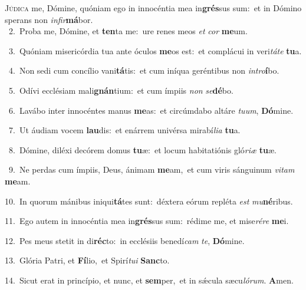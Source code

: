 \lettrine{\initial\textcolor{\initialcolor}{J}}{údica} me, Dómine, quóniam ego in innocéntia mea in\-\textbf{grés}\-sus sum:~\star et in Dómino sperans non \textit{in}\-\textit{fir}\textbf{má}bor.\\
{\numbfont\textcolor{\numbcolor}{~2.}}~Proba me, Dómine, et \textbf{ten}\-ta me:~\star ure renes meos \textit{et} \textit{cor} \textbf{me}\-um.\par
{\numbfont\textcolor{\numbcolor}{~3.}}~Quóniam misericórdia tua ante óculos \textbf{me}\-os est:~\star et complácui in veri\-\textit{tá}\-\textit{te} \textbf{tu}\-a.\par
{\numbfont\textcolor{\numbcolor}{~4.}}~Non sedi cum concílio vani\-\textbf{tá}\-tis:~\star et cum iníqua geréntibus non \textit{in}\-\textit{tro}\textbf{í}bo.\par
{\numbfont\textcolor{\numbcolor}{~5.}}~Odívi ecclésiam mali\-\textbf{gnán}\-tium:~\star et cum ímpiis \textit{non} \textit{se}\-\textbf{dé}bo.\par
{\numbfont\textcolor{\numbcolor}{~6.}}~Lavábo inter innocéntes manus \textbf{me}\-as:~\star et circúmdabo altáre \textit{tu}\-\textit{um}, \textbf{Dó}\-mine.\par
{\numbfont\textcolor{\numbcolor}{~7.}}~Ut áudiam vocem \textbf{lau}\-dis:~\star et enárrem univérsa mirabí\-\textit{li}\-\textit{a} \textbf{tu}\-a.\par
{\numbfont\textcolor{\numbcolor}{~8.}}~Dómine, diléxi decórem domus \textbf{tu}\-æ:~\star et locum habitatiónis gló\-\textit{ri}\-\textit{æ} \textbf{tu}\-æ.\par
{\numbfont\textcolor{\numbcolor}{~9.}}~Ne perdas cum ímpiis, Deus, ánimam \textbf{me}\-am,~\star et cum viris sánguinum \textit{vi}\-\textit{tam} \textbf{me}\-am.\par
{\numbfont\textcolor{\numbcolor}{10.}}~In quorum mánibus iniqui\-\textbf{tá}\-tes sunt:~\star déxtera eórum repléta \textit{est} \textit{mu}\-\textbf{né}ribus.\par
{\numbfont\textcolor{\numbcolor}{11.}}~Ego autem in innocéntia mea in\-\textbf{grés}\-sus sum:~\star rédime me, et mise\-\textit{ré}\-\textit{re} \textbf{me}\-i.\par
{\numbfont\textcolor{\numbcolor}{12.}}~Pes meus stetit in di\-\textbf{réc}\-to:~\star in ecclésiis benedí\textit{cam} \textit{te}\-, \textbf{Dó}\-mine.\par
{\numbfont\textcolor{\numbcolor}{13.}}~Glória Patri, et \textbf{Fí}\-lio,~\star et Spirí\-\textit{tu}\-\textit{i} \textbf{Sanc}\-to.\par
{\numbfont\textcolor{\numbcolor}{14.}}~Sicut erat in princípio, et nunc, et \textbf{sem}\-per,~\star et in sǽcula sæcu\-\textit{ló}\-\textit{rum}. \textbf{A}\-men.\par
